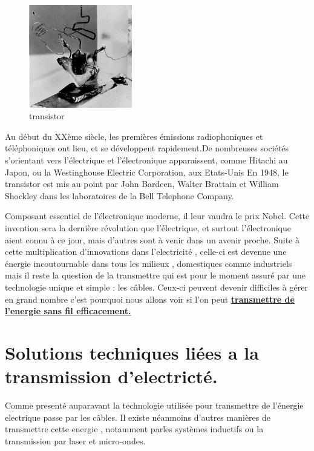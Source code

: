 \documentclass[12pt]{report}
\begin{document}
\begin{figure}
  \begin{center}
    \includegraphics[width=0.4\textwidth]{transistor}
  \end{center}
  \caption{transistor}
\end{figure} Au début du XXème siècle, les premières émissions radiophoniques et téléphoniques ont lieu, et se développent rapidement.De nombreuses sociétés s'orientant vers l'électrique et l'électronique apparaissent, comme Hitachi au Japon, ou la Westinghouse Electric Corporation, aux Etats-Unis
En 1948, le transistor est mis au point par John Bardeen, Walter Brattain et William Shockley dans les laboratoires de la Bell Telephone Company. 

Composant essentiel de l'électronique moderne, il leur vaudra le prix Nobel.
Cette invention sera la dernière révolution que l'électrique, et surtout l'électronique aient connu à ce jour, mais d'autres sont à venir dans un avenir proche. Suite à cette multiplication d'innovations dans l'electricité , celle-ci est devenue une énergie incoutournable dans tous les milieux , domestiques comme industriels mais il reste la question de la transmettre qui est pour le moment assuré par une technologie unique et simple : les câbles. Ceux-ci peuvent devenir difficiles à gérer en grand nombre c'est pourquoi nous allons voir si l'on peut \textbf{\underline{transmettre de l'energie sans fil efficacement.}}

\chapter{Solutions techniques liées a la transmission d'electricté.}
  Comme presenté auparavant la technologie utilisée pour transmettre de l'énergie electrique passe par les câbles.
  Il existe néanmoins d'autres manières de transmettre cette energie , notamment parles systèmes inductifs ou la transmission par laser et micro-ondes.
  
\end{document}
